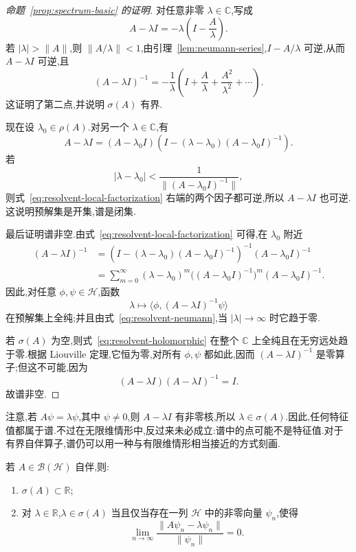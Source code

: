 \begin{proof}[命题~\ref{prop:spectrum-basic} 的证明]
对任意非零 \(\lambda\in\mathbb{C}\),写成
\[
A-\lambda I=-\lambda\left(I-\frac{A}{\lambda}\right).
\]
若 \(|\lambda|>\|A\|\),则 \(\|A/\lambda\|<1\),由引理~\ref{lem:neumann-series},\(I-A/\lambda\) 可逆,从而 \(A-\lambda I\) 可逆,且
\[
(A-\lambda I)^{-1}
=-\frac{1}{\lambda}\left(I+\frac{A}{\lambda}+\frac{A^{2}}{\lambda^{2}}+\cdots\right).
\label{eq:resolvent-neumann}
\]
这证明了第二点,并说明 \(\sigma(A)\) 有界.

现在设 \(\lambda_{0}\in\rho(A)\).对另一个 \(\lambda\in\mathbb{C}\),有
\[
A-\lambda I=(A-\lambda_{0}I)\left(I-(\lambda-\lambda_{0})(A-\lambda_{0}I)^{-1}\right).
\label{eq:resolvent-local-factorization}
\]
若
\[
|\lambda-\lambda_{0}|<\frac{1}{\|(A-\lambda_{0}I)^{-1}\|},
\]
则式~\eqref{eq:resolvent-local-factorization} 右端的两个因子都可逆,所以 \(A-\lambda I\) 也可逆.这说明预解集是开集,谱是闭集.

最后证明谱非空.由式~\eqref{eq:resolvent-local-factorization} 可得,在 \(\lambda_{0}\) 附近
\[
\begin{aligned}
(A-\lambda I)^{-1}
&=\left(I-(\lambda-\lambda_{0})(A-\lambda_{0}I)^{-1}\right)^{-1}(A-\lambda_{0}I)^{-1}\\
&=\sum_{m=0}^{\infty}(\lambda-\lambda_{0})^{m}
\bigl((A-\lambda_{0}I)^{-1}\bigr)^{m}(A-\lambda_{0}I)^{-1}.
\end{aligned}
\label{eq:resolvent-local-series}
\]
因此,对任意 \(\phi,\psi\in\mathcal{H}\),函数
\[
\lambda\longmapsto\langle\phi,(A-\lambda I)^{-1}\psi\rangle
\label{eq:resolvent-holomorphic}
\]
在预解集上全纯;并且由式~\eqref{eq:resolvent-neumann},当 \(|\lambda|\to\infty\) 时它趋于零.

若 \(\sigma(A)\) 为空,则式~\eqref{eq:resolvent-holomorphic} 在整个 \(\mathbb{C}\) 上全纯且在无穷远处趋于零.根据 Liouville 定理,它恒为零,对所有 \(\phi,\psi\) 都如此,因而 \((A-\lambda I)^{-1}\) 是零算子;但这不可能,因为
\[
(A-\lambda I)(A-\lambda I)^{-1}=I.
\]
故谱非空.
\end{proof}

注意,若 \(A\psi=\lambda\psi\),其中 \(\psi\neq0\),则 \(A-\lambda I\) 有非零核,所以 \(\lambda\in\sigma(A)\).因此,任何特征值都属于谱.不过在无限维情形中,反过来未必成立:谱中的点可能不是特征值.对于有界自伴算子,谱仍可以用一种与有限维情形相当接近的方式刻画.

\begin{proposition}[有界自伴算子的谱刻画]\label{prop:selfadjoint-spectrum-characterization}
若 \(A\in\mathcal{B}(\mathcal{H})\) 自伴,则:
\begin{enumerate}
\item \(\sigma(A)\subset\mathbb{R}\);
\item 对 \(\lambda\in\mathbb{R}\),\(\lambda\in\sigma(A)\) 当且仅当存在一列 \(\mathcal{H}\) 中的非零向量 \(\psi_{n}\),使得
\[
\lim_{n\to\infty}\frac{\|A\psi_{n}-\lambda\psi_{n}\|}{\|\psi_{n}\|}=0.
\label{eq:almost-eigenvalue}
\]
\end{enumerate}
\end{proposition}

